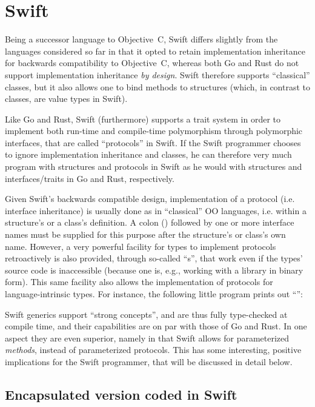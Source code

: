\documentclass[11pt,oneside]{report}
\newcommand{\code}[1]{{\selectfont\ttfamily{#1}}}
\begin{document}
\section{Swift}

Being a successor language to Objective~C, Swift differs slightly from
the languages considered so far in that it opted to retain
implementation inheritance for backwards compatibility to Objective~C,
whereas both Go and Rust do not support implementation inheritance
\emph{by design}. Swift therefore supports ``classical'' classes, but
it also allows one to bind methods to structures (which, in contrast
to classes, are value types in Swift).

Like Go and Rust, Swift (furthermore) supports a trait system in order
to implement both run-time and compile-time polymorphism through
polymorphic interfaces, that are called ``protocols'' in Swift. If the
Swift programmer chooses to ignore implementation inheritance and
classes, he can therefore very much program with structures and
protocols in Swift as he would with structures and interfaces/traits
in Go and Rust, respectively.

Given Swift's backwards compatible design, implementation of a
protocol (i.e. interface inheritance) is usually done as in
``classical'' OO languages, i.e. within a structure's or a class's
definition. A colon (\code{:}) followed by one or more
interface names must be supplied for this purpose after the
structure's or class's own name. However, a very powerful facility for
types to implement protocols retroactively is also provided, through
so-called ``\code{extension}s'', that work even if the types' source
code is inaccessible (because one is, e.g., working with a library in
binary form). This same facility also allows the implementation of
protocols for language-intrinsic types. For instance, the following
little program prints out ``\code{I am 4.9}'':


Swift generics support ``strong concepts'', and are thus fully
type-checked at compile time, and their capabilities are on par with
those of Go and Rust. In one aspect they are even superior, namely in
that Swift allows for parameterized \emph{methods}, instead of
parameterized protocols. This has some interesting, positive
implications for the Swift programmer, that will be discussed in
detail below.

\subsection{Encapsulated version coded in Swift}
\end{document}
